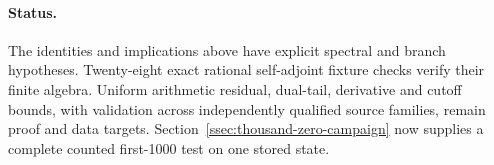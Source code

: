 \paragraph{Status.}
The identities and implications above have explicit spectral and branch
hypotheses. Twenty-eight exact rational self-adjoint fixture checks verify
their finite algebra. Uniform arithmetic residual, dual-tail, derivative
and cutoff bounds, with validation across independently qualified source families,
remain proof and data targets. Section~\ref{ssec:thousand-zero-campaign}
now supplies a complete counted first-1000 test on one stored state.
